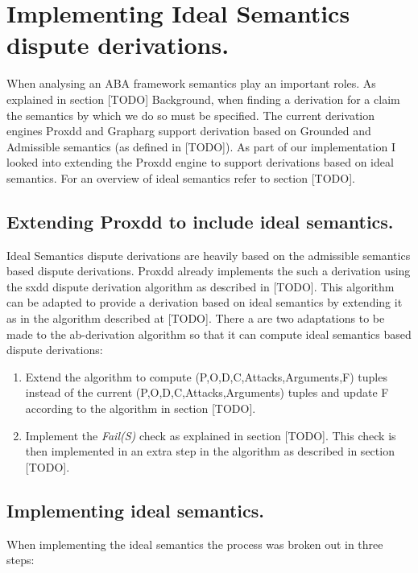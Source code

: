 \newpage

\chapter{Implementing Ideal Semantics dispute derivations.}

When analysing an ABA framework semantics play an important roles. As explained in section [TODO] Background, when finding a derivation for a claim the semantics by which we do so must be specified. The current derivation engines Proxdd and Grapharg support derivation based on Grounded and Admissible semantics (as defined in [TODO]). As part of our implementation I looked into extending the Proxdd engine to support derivations based on ideal semantics. For an overview of ideal semantics refer to section [TODO].

\section{Extending Proxdd to include ideal semantics.}

Ideal Semantics dispute derivations are heavily based on the admissible semantics based dispute derivations. Proxdd already implements the such a derivation using the sxdd dispute derivation algorithm as described in [TODO]. This algorithm can be adapted to provide a derivation based on ideal semantics by extending it as in the algorithm described at  [TODO]. There a are two adaptations to be made to the ab-derivation algorithm so that it can compute ideal semantics based dispute derivations:

\begin{enumerate}
\item Extend the algorithm to compute (P,O,D,C,Attacks,Arguments,F) tuples instead of the current (P,O,D,C,Attacks,Arguments) tuples and update F according to the algorithm in section [TODO].
\item Implement the \emph{Fail(S)} check as explained in section [TODO]. This check is then implemented in an extra step in the algorithm as described in section [TODO].
\end{enumerate}

\section{Implementing ideal semantics.}

When implementing the ideal semantics the process was broken out in three steps:

